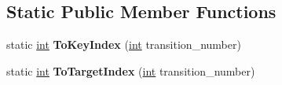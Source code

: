 \subsection*{Static Public Member Functions}
\begin{DoxyCompactItemize}
\item 
\mbox{\label{classv8_1_1internal_1_1TransitionArray_a1921e0066146c0dd4219d05e660e636b}} 
static \mbox{\hyperlink{classint}{int}} {\bfseries To\+Key\+Index} (\mbox{\hyperlink{classint}{int}} transition\+\_\+number)
\item 
\mbox{\label{classv8_1_1internal_1_1TransitionArray_aafbf4ba7c3804875dd67e1937dfc964e}} 
static \mbox{\hyperlink{classint}{int}} {\bfseries To\+Target\+Index} (\mbox{\hyperlink{classint}{int}} transition\+\_\+number)
\end{DoxyCompactItemize}
